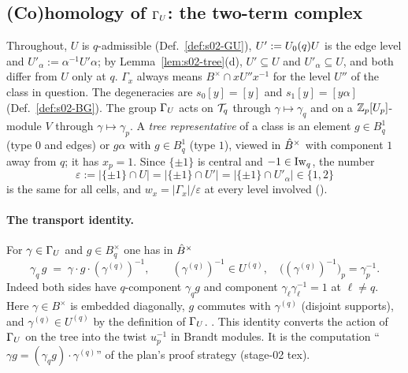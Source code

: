 \subsection{(Co)homology of $\Gamma_U$: the two-term complex}\label{ss:s02-coh}

Throughout, $U$ is $q$-admissible (Def.~\ref{def:s02-GU}), $U':=U_0(q)U$ is the edge level and
$U'_\alpha:=\alpha^{-1}U'\alpha$; by Lemma~\ref{lem:s02-tree}(d), $U'\subseteq U$ and $U'_\alpha\subseteq U$, and both
differ from $U$ only at $q$. $\Gamma_x$ always means $B^\times\cap xU''x^{-1}$ for the level $U''$ of the class in question. The
degeneracies are $s_0[y]=[y]$ and $s_1[y]=[y\alpha]$ (Def.~\ref{def:s02-BG}). The group $\Gamma_U$ acts on $\mathcal{T}_q$ through
$\gamma\mapsto\gamma_q$ and on a $\mathbb{Z}_p[U_p]$-module $V$ through $\gamma\mapsto\gamma_p$. A \emph{tree representative} of a class is
an element $g\in B^1_q$ (type $0$ and edges) or $g\alpha$ with $g\in B^1_q$ (type $1$), viewed in $\hat{B}^\times$ with
component $1$ away from $q$; it has $x_p=1$. Since $\{\pm1\}$ is central and $-1\in\mathrm{Iw}_q$, the number
\[\varepsilon:=|\{\pm1\}\cap U|=|\{\pm1\}\cap U'|=|\{\pm1\}\cap U'_\alpha|\in\{1,2\}\]
is the same for all cells, and $w_x=|\Gamma_x|/\varepsilon$ at every level involved ().

\paragraph{The transport identity.} For $\gamma\in\Gamma_U$ and $g\in B_q^\times$ one has in $\hat{B}^\times$
\begin{equation}\label{eq:s02-transport}
\gamma_q\,g\;=\;\gamma\cdot g\cdot(\gamma^{(q)})^{-1},\qquad (\gamma^{(q)})^{-1}\in U^{(q)},\quad\big((\gamma^{(q)})^{-1}\big)_p=\gamma_p^{-1}.
\end{equation}
Indeed both sides have $q$-component $\gamma_qg$ and component $\gamma_\ell\gamma_\ell^{-1}=1$ at $\ell\ne q$. Here $\gamma\in B^\times$ is
embedded diagonally, $g$ commutes with $\gamma^{(q)}$ (disjoint supports), and $\gamma^{(q)}\in U^{(q)}$ by the
definition of $\Gamma_U$. \stproved. This identity converts the action of $\Gamma_U$ on the tree into the twist $u_p^{-1}$ in Brandt modules.
It is the computation ``$\gamma g=(\gamma_qg)\cdot\gamma^{(q)}$'' of the plan's proof strategy (stage-02 tex).


